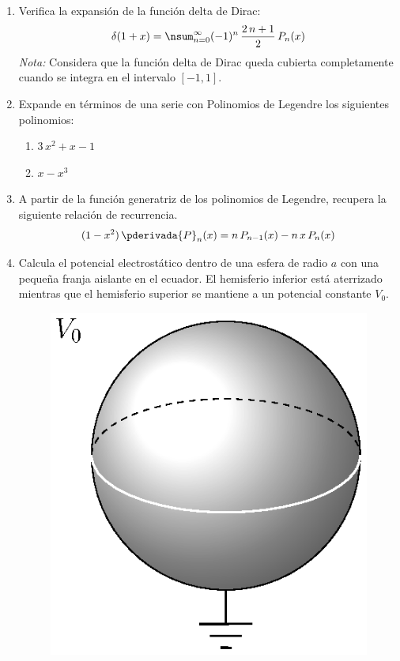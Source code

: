 \begin{enumerate}
\item Verifica la expansión de la función delta de Dirac:
\begin{align*}
\delta (1 + x) = \nsum_{n=0}^{\infty} (-1)^{n} \, \dfrac{2 \,n + 1}{2} \, P_{n} (x)
\end{align*}
\emph{Nota:} Considera que la función delta de Dirac queda cubierta completamente cuando se integra en el intervalo $[-1, 1]$.
\item Expande en términos de una serie con Polinomios de Legendre los siguientes polinomios:
\begin{enumerate}[label=\alph*)]
\item $3 \, x^{2} + x - 1$
\item $x - x^{3}$
\end{enumerate}
\item A partir de la función generatriz de los polinomios de Legendre, recupera la siguiente relación de recurrencia.
\begin{align*}
(1 - x^{2}) \, \pderivada{P}_{n} (x) = n \, P_{n-1} (x) - n \, x \, P_{n} (x)
\end{align*}
\item Calcula el potencial electrostático dentro de una esfera de radio $a$ con una pequeña franja aislante en el ecuador. El hemisferio inferior está aterrizado mientras que el hemisferio superior se mantiene a un potencial constante $V_{0}$.
\begin{figure}[H]
    \centering
    \includegraphics[scale=1]{Imagenes/esfera_5.eps}

\end{figure}
\end{enumerate}
